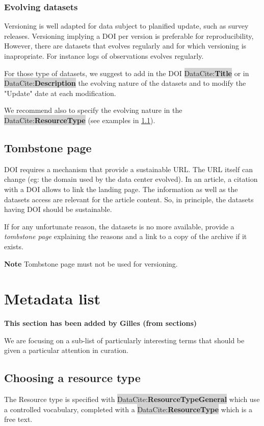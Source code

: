 \documentclass[11pt,a4paper]{ivoa}
\newcommand{\dataciteterm}[1]{\colorbox{lightgray}{DataCite:\textbf{#1}}}
\newcommand{\important}[1]{
	\begin{bigdescription}
		\item \color{ivoacolor}\textbf{Note} #1
	\end{bigdescription}
}
\begin{document}
\subsubsection{Evolving datasets}
\label{sec:evolving}
Versioning is well adapted for data subject to planified update, such as survey releases. Versioning implying a DOI per version is preferable for reproducibility, 
However, there are datasets that evolves regularly and for which versioning is inapropriate. For instance logs of observations evolves regularly.


For those type of datasets, we suggest to add in the DOI \dataciteterm{Title} or in \dataciteterm{Description} the evolving nature of the datasets and to modify the "Update" date at each modification.

We recommend also to specify the evolving nature in the \dataciteterm{ResourceType} (see examples in \ref{sec:resourcetype}).\\


\subsection{Tombstone page}
\label{sec:tombstone}
DOI requires a mechanism that provide a sustainable URL. The URL itself can change (eg: the domain used by the data center evolved).
In an article, a citation with a DOI allows to link the landing page. The information as well as the datasets access are relevant for the article content. So, in principle, the datasets having DOI should be sustainable. 


If for any unfortunate reason, the datasets is no more available, provide a \textit{tombstone page} explaining the reasons and a link to a copy of the archive if it exists.

\important{Tombstone page must not be used for versioning.}


\section{Metadata list}
\textbf{\color{red}This section has been added by Gilles (from sections)}

We are focusing on a sub-list of particularly interesting terms that should be given a particular attention in curation.


\subsection{Choosing a resource type}\label{sec:resourcetype}
The Resource type is specified with  \dataciteterm{ResourceTypeGeneral} which use a controlled vocabulary, completed with a \dataciteterm{ResourceType} which is a free text.
\end{document}
